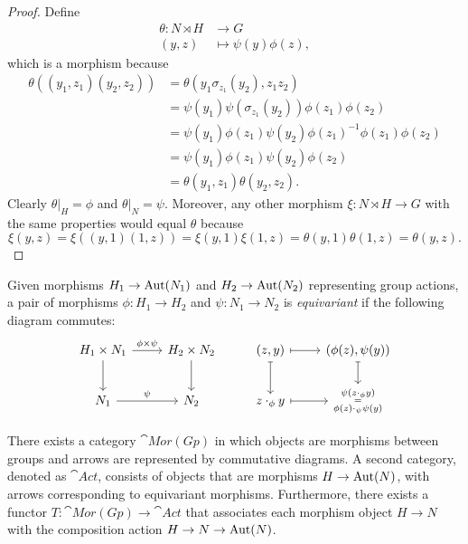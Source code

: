 \begin{proof}
    Define
    \begin{align*}
        \theta\colon N\rtimes H&\to G\\
        (y,z)&\mapsto\psi(y)\phi(z),
    \end{align*}
    which is a morphism because
    \begin{align*}
        \theta((y_1,z_1)(y_2,z_2)) &= \theta(y_1\sigma_{z_1}(y_2),z_1z_2)\\
            &= \psi(y_1)\psi(\sigma_{z_1}(y_2))\phi(z_1)\phi(z_2)\\
            &= \psi(y_1)\phi(z_1)\psi(y_2)\phi(z_1)^{-1}\phi(z_1)
                \phi(z_2)\\
            &= \psi(y_1)\phi(z_1)\psi(y_2)\phi(z_2)\\
            &= \theta(y_1,z_1)\theta(y_2,z_2).
    \end{align*}
    Clearly $\theta|_H=\phi$ and $\theta|_N=\psi$. Moreover, any other morphism $\xi\colon N\rtimes H\to G$ with the same properties would equal $\theta$ because
    $$
        \xi(y,z)=\xi((y,1)(1,z))=\xi(y,1)\xi(1,z)=\theta(y,1)\theta(1,z)
            = \theta(y,z).
    $$
\end{proof}

\begin{defn}
    Given morphisms $H_1\to{\rm Aut}(N_1)$ and $H_2\to{\rm Aut}(N_2)$ representing group actions, a pair of morphisms $\phi\colon H_1\to H_2$ and $\psi\colon N_1\to N_2$ is \textsl{equivariant} if the following diagram commutes:
    $$
        \begin{tikzcd}
            H_1\times N_1
                    \arrow[r,"\phi\times \psi"]
                    \arrow[d]
                &H_2\times N_2
                    \arrow[d]
                &{(z,y)}
                    \arrow[r,mapsto]
                    \arrow[d,mapsto]
                &(\phi(z),\psi(y))
                    \arrow[d,mapsto]\\
            N_1
                    \arrow[r,"\psi"]
            &N_2
            &z\cdot_\phi y
                    \arrow[r,mapsto]
                &\substack{\psi(z\cdot_\phi y)\\
                    =\\
                    \phi(z)\cdot_\psi\psi(y)}
        \end{tikzcd}
    $$
\end{defn}

\begin{thm}
    There exists a category\/ $\cat{Mor(Gp)}$ in which objects are morphisms between groups and arrows are represented by commutative diagrams. A second category, denoted as\/ $\cat{Act}$, consists of objects that are morphisms\/ $H \to{\rm Aut}(N)$, with arrows corresponding to equivariant morphisms. Furthermore, there exists a functor\/ $T: \cat{Mor(Gp)} \to \cat{Act}$ that associates each morphism object\/ $H \to N$ with the composition action\/ $H \to N \to {\rm Aut}(N)$.
\end{thm}

